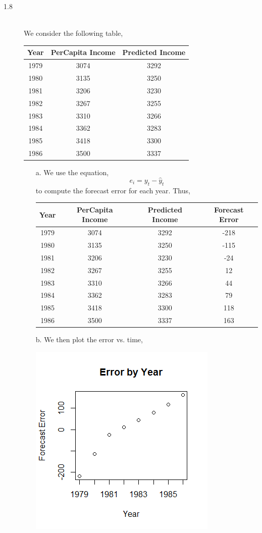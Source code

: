 \documentclass[letterpaper,10pt]{article}
\begin{document}
\begin{description}
\item[1.8]\hfill \\
We consider the following table,\\
\begin{center}
\begin{tabular}{ccc}
Year & PerCapita Income & Predicted Income \\\hline
1979 & 3074 & 3292 \\
1980 & 3135 & 3250 \\
1981 & 3206 & 3230 \\
1982 & 3267 & 3255 \\
1983 & 3310 & 3266 \\
1984 & 3362 & 3283 \\
1985 & 3418 & 3300 \\
1986 & 3500 & 3337
\end{tabular}
\end{center}
\begin{enumerate}
\item[a.] We use the equation,
\[e_i=y_t-\hat{y}_t\]
to compute the forecast error for each year. Thus,
\begin{center}
\begin{tabular}{cccc}
Year & PerCapita Income & Predicted Income & Forecast Error \\\hline
1979 & 3074 & 3292 & -218\\
1980 & 3135 & 3250 & -115\\
1981 & 3206 & 3230 & -24\\
1982 & 3267 & 3255 & 12\\
1983 & 3310 & 3266 & 44\\
1984 & 3362 & 3283 & 79\\
1985 & 3418 & 3300 & 118\\
1986 & 3500 & 3337 & 163
\end{tabular}
\end{center}
\item[b.] We then plot the error vs. time,
\begin{center}
\includegraphics{errtime.png}

\end{center}
\end{enumerate}
\end{description}
\end{document}
